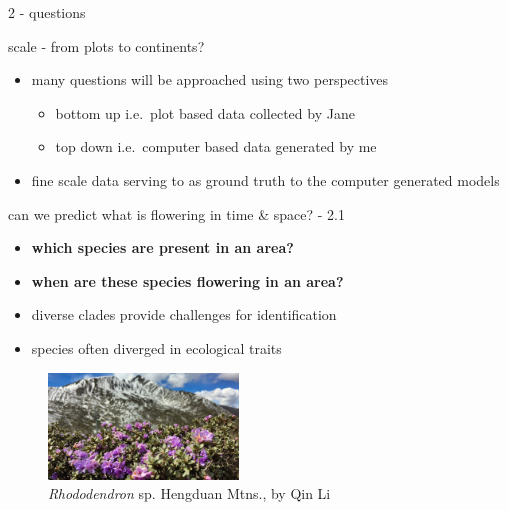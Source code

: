 \documentclass[
  ignorenonframetext,
]{beamer}
\providecommand{\tightlist}{%
  \setlength{\itemsep}{0pt}\setlength{\parskip}{0pt}}
\begin{document}
\begin{frame}{2 - questions}
\protect\hypertarget{questions}{}
\end{frame}

\begin{frame}{scale - from plots to continents?}
\protect\hypertarget{scale---from-plots-to-continents}{}
\begin{itemize}
\tightlist
\item
  many questions will be approached using two perspectives

  \begin{itemize}
  \tightlist
  \item
    bottom up i.e.~plot based data collected by Jane
  \item
    top down i.e.~computer based data generated by me
  \end{itemize}
\item
  fine scale data serving to as ground truth to the computer generated
  models
\end{itemize}
\end{frame}

\begin{frame}{can we predict what is flowering in time \& space? - 2.1}
\protect\hypertarget{can-we-predict-what-is-flowering-in-time-space---2.1}{}
\begin{itemize}
\tightlist
\item
  \textbf{which species are present in an area?}
\item
  \textbf{when are these species flowering in an area?}
\item
  diverse clades provide challenges for identification
\item
  species often diverged in ecological traits
\end{itemize}

\begin{figure}
\centering
\includegraphics[width=0.45\textwidth,height=\textheight]{../graphics/pictures/Rhododendron_QinLi.jpg}
\caption{\emph{Rhododendron} sp. Hengduan Mtns., by Qin Li}
\end{figure}
\end{frame}
\end{document}
